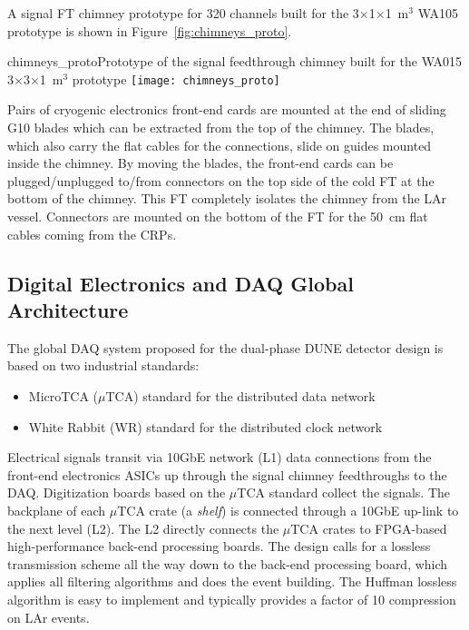 A signal FT chimney prototype for 320 channels built for the
3$\times$1$\times$1~m$^3$ WA105 prototype is shown in
Figure~\ref{fig:chimneys_proto}.
\begin{cdrfigure}
{chimneys_proto}{Prototype of the signal feedthrough chimney built 
for the WA015 3$\times$3$\times$1~m$^3$ prototype}
\texttt{[image: chimneys\_proto]}
\end{cdrfigure}

Pairs of cryogenic electronics front-end cards are mounted at the end of
sliding G10 blades which can be extracted from the top of the
chimney. The blades, which also carry the flat cables for the
connections, slide on guides mounted inside the chimney. By
moving the blades, the front-end cards can be plugged/unplugged to/from 
connectors on the top side of the cold FT at
the bottom of the chimney. This FT completely isolates the
chimney from the LAr vessel. Connectors are mounted on the bottom of the FT 
for the 50~cm flat cables coming from the CRPs.

\subsection{Digital Electronics and DAQ Global Architecture}
\label{sec:fd-alt-elec-daq}


The global DAQ system  proposed for the dual-phase DUNE
detector design is based on two industrial standards:
\begin{itemize}
\item MicroTCA ($\mu$TCA) standard for the distributed data network\cite{mTCA-standard}
\item White Rabbit (WR) standard for the distributed clock network\cite{WR-standard}
\end{itemize}

Electrical signals transit via 10GbE network (L1) data connections
from the front-end electronics ASICs up through the 
signal chimney feedthroughs to the DAQ. 
Digitization boards based on the $\mu$TCA standard collect the signals. 
The backplane of each $\mu$TCA crate (a \textit{shelf}) is connected through a 10GbE up-link
to the next level (L2). The L2 directly connects the $\mu$TCA crates
to FPGA-based high-performance back-end processing boards. 
The design calls for a lossless transmission scheme all the way down to the
back-end processing board, which applies all filtering algorithms and
does the event building. The Huffman lossless algorithm is easy to
implement and typically provides a factor  of 10 compression on LAr events.


